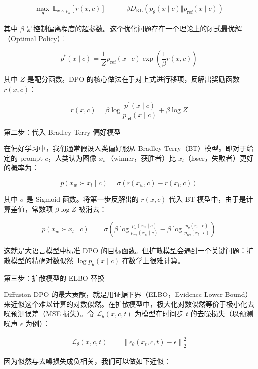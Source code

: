 \[
\begin{aligned}
\max_\theta\ \mathbb{E}_{x\sim p_\theta}\left[r(x,c)\right]
&\quad-\beta D_{\mathrm{KL}}\left(p_\theta(x\mid c)\Vert p_{\mathrm{ref}}(x\mid c)\right)
\end{aligned}
\]

其中 \(\beta\) 是控制偏离程度的超参数。这个优化问题存在一个理论上的闭式最优解（Optimal Policy）：

\[
p^{*}(x\mid c)=\frac{1}{Z}p_{\mathrm{ref}}(x\mid c)\exp\left(\frac{1}{\beta}r(x,c)\right)
\]

其中 \(Z\) 是配分函数。DPO 的核心做法在于对上式进行移项，反解出奖励函数 \(r(x,c)\)：

\[
r(x,c)=\beta\log\frac{p^{*}(x\mid c)}{p_{\mathrm{ref}}(x\mid c)}+\beta\log Z
\]

第二步：代入 Bradley-Terry 偏好模型

在偏好学习中，我们通常假设人类偏好服从 Bradley-Terry（BT）模型。即对于给定的 prompt \(c\)，人类认为图像 \(x_w\)（winner，获胜者）比 \(x_l\)（loser，失败者）更好的概率为：

\[
p(x_w\succ x_l\mid c)=\sigma\left(r(x_w,c)-r(x_l,c)\right)
\]

其中 \(\sigma\) 是 Sigmoid 函数。将第一步反解出的 \(r(x,c)\) 代入 BT 模型中，由于是计算差值，常数项 \(\beta\log Z\) 被消去：

\[
\begin{aligned}
p(x_w\succ x_l\mid c)
&=\sigma\left(
\beta\log\frac{p_\theta(x_w\mid c)}{p_{\mathrm{ref}}(x_w\mid c)}
-\beta\log\frac{p_\theta(x_l\mid c)}{p_{\mathrm{ref}}(x_l\mid c)}
\right)
\end{aligned}
\]

这就是大语言模型中标准 DPO 的目标函数。但扩散模型会遇到一个关键问题：扩散模型的精确对数似然 \(\log p_\theta(x\mid c)\) 在数学上很难计算。

第三步：扩散模型的 ELBO 替换

Diffusion-DPO 的最大贡献，就是用证据下界（ELBO，Evidence Lower Bound）来近似这个难以计算的对数似然。在扩散模型中，极大化对数似然等价于极小化去噪预测误差（MSE 损失）。令 \(\mathcal{L}_\theta(x,c,t)\) 为模型在时间步 \(t\) 的去噪损失（以预测噪声 \(\epsilon\) 为例）：

\[
\begin{aligned}
\mathcal{L}_\theta(x,c,t)
&=\left\lVert \epsilon_\theta(x_t,c,t)-\epsilon\right\rVert_2^2
\end{aligned}
\]

因为似然与去噪损失成负相关，我们可以做如下近似：


